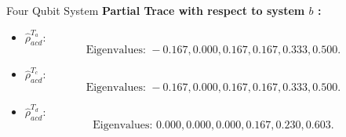 \documentclass{beamer}
\begin{document}
\begin{frame}{Four Qubit System}
\textbf{Partial Trace with respect to system $b$ :}
\begin{itemize}
	\item {}$\hat{\rho}_{acd}^{T_a}$:
	\begin{equation*}
		\text{Eigenvalues: }-0.167, 0.000, 0.167, 0.167, 0.333, 0.500.
	\end{equation*}
	\item {}$\hat{\rho}_{acd}^{T_c}$:
	\begin{equation*}
		\text{Eigenvalues: }-0.167, 0.000, 0.167, 0.167, 0.333, 0.500.
	\end{equation*}
	\item {}$\hat{\rho}_{acd}^{T_d}$:
	\begin{equation*}
		\text{Eigenvalues: }0.000, 0.000, 0.000, 0.167, 0.230, 0.603.
	\end{equation*}
\end{itemize}
\end{frame}
\end{document}
